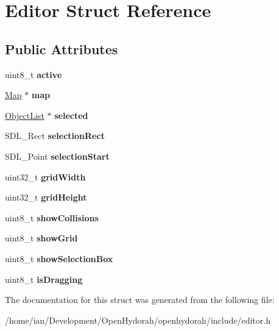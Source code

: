 \hypertarget{structEditor}{\section{Editor Struct Reference}
\label{structEditor}
}
\subsection*{Public Attributes}
\begin{DoxyCompactItemize}
\item 
\hypertarget{structEditor_ada0be848906040697cf1b2fafbc7c6d1}{uint8\-\_\-t {\bfseries active}}\label{structEditor_ada0be848906040697cf1b2fafbc7c6d1}

\item 
\hypertarget{structEditor_a5c3aad3feaf55fae34d3db52cf78ebed}{\hyperlink{structSMap}{Map} $\ast$ {\bfseries map}}\label{structEditor_a5c3aad3feaf55fae34d3db52cf78ebed}

\item 
\hypertarget{structEditor_af167699de4a87611b3dbb932b3dc4d5c}{\hyperlink{structSObjectList}{Object\-List} $\ast$ {\bfseries selected}}\label{structEditor_af167699de4a87611b3dbb932b3dc4d5c}

\item 
\hypertarget{structEditor_a84e66cf3279cfcbf3843306cbf357f44}{S\-D\-L\-\_\-\-Rect {\bfseries selection\-Rect}}\label{structEditor_a84e66cf3279cfcbf3843306cbf357f44}

\item 
\hypertarget{structEditor_a7dedf081ff5c128fe72a244185af855f}{S\-D\-L\-\_\-\-Point {\bfseries selection\-Start}}\label{structEditor_a7dedf081ff5c128fe72a244185af855f}

\item 
\hypertarget{structEditor_a0f022b91ded320c698a4194f4d49660b}{uint32\-\_\-t {\bfseries grid\-Width}}\label{structEditor_a0f022b91ded320c698a4194f4d49660b}

\item 
\hypertarget{structEditor_aea161102459648424d8f8f817942b496}{uint32\-\_\-t {\bfseries grid\-Height}}\label{structEditor_aea161102459648424d8f8f817942b496}

\item 
\hypertarget{structEditor_adb85ff53f8232fee4d5cf5cdf4b8341b}{uint8\-\_\-t {\bfseries show\-Collisions}}\label{structEditor_adb85ff53f8232fee4d5cf5cdf4b8341b}

\item 
\hypertarget{structEditor_a4e67062f3aa56e1bb2eb7b71477f7537}{uint8\-\_\-t {\bfseries show\-Grid}}\label{structEditor_a4e67062f3aa56e1bb2eb7b71477f7537}

\item 
\hypertarget{structEditor_a837080e163df6d0b65b0b87066266efa}{uint8\-\_\-t {\bfseries show\-Selection\-Box}}\label{structEditor_a837080e163df6d0b65b0b87066266efa}

\item 
\hypertarget{structEditor_a69dab3d5e57492e8f28683df964f519e}{uint8\-\_\-t {\bfseries is\-Dragging}}\label{structEditor_a69dab3d5e57492e8f28683df964f519e}

\end{DoxyCompactItemize}


The documentation for this struct was generated from the following file\-:\begin{DoxyCompactItemize}
\item 
/home/ian/\-Development/\-Open\-Hydorah/openhydorah/include/editor.\-h\end{DoxyCompactItemize}
